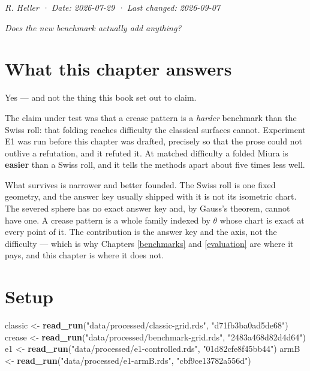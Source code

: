 \documentclass[
  british,
  a4paper,
]{book}
\newenvironment{Shaded}{\begin{snugshade}}{\end{snugshade}}
\newcommand{\FunctionTok}[1]{\textcolor[rgb]{0.13,0.29,0.53}{\textbf{#1}}}
\newcommand{\NormalTok}[1]{#1}
\newcommand{\OtherTok}[1]{\textcolor[rgb]{0.56,0.35,0.01}{#1}}
\newcommand{\StringTok}[1]{\textcolor[rgb]{0.31,0.60,0.02}{#1}}
\begin{document}
\emph{R. Heller · Date: 2026-07-29 · Last changed: 2026-09-07}

\emph{Does the new benchmark actually add anything?}

\section{What this chapter answers}\label{comp-question}

Yes --- and not the thing this book set out to claim.

The claim under test was that a crease pattern is a \emph{harder} benchmark than the
Swiss roll: that folding reaches difficulty the classical surfaces cannot.
Experiment E1 was run before this chapter was drafted, precisely so that the
prose could not outlive a refutation, and it refuted it. At matched difficulty a
folded Miura is \textbf{easier} than a Swiss roll, and it tells the methods apart
about five times less well.

What survives is narrower and better founded. The Swiss roll is one fixed
geometry, and the answer key usually shipped with it is not its isometric chart.
The severed sphere has no exact answer key and, by Gauss's theorem, cannot have
one. A crease pattern is a whole family indexed by \(\theta\) whose chart is exact
at every point of it. The contribution is the answer key and the axis, not the
difficulty --- which is why Chapters \ref{benchmarks} and \ref{evaluation} are
where it pays, and this chapter is where it does not.

\section{Setup}\label{comp-setup}

\begin{Shaded}
\begin{Highlighting}[]
\NormalTok{classic }\OtherTok{\textless{}{-}} \FunctionTok{read\_run}\NormalTok{(}\StringTok{"data/processed/classic{-}grid.rds"}\NormalTok{,   }\StringTok{"d71fb3ba0ad5de68"}\NormalTok{)}
\NormalTok{crease  }\OtherTok{\textless{}{-}} \FunctionTok{read\_run}\NormalTok{(}\StringTok{"data/processed/benchmark{-}grid.rds"}\NormalTok{, }\StringTok{"2483a468d82d4d64"}\NormalTok{)}
\NormalTok{e1      }\OtherTok{\textless{}{-}} \FunctionTok{read\_run}\NormalTok{(}\StringTok{"data/processed/e1{-}controlled.rds"}\NormalTok{,  }\StringTok{"01d82cfe8f45bb44"}\NormalTok{)}
\NormalTok{armB    }\OtherTok{\textless{}{-}} \FunctionTok{read\_run}\NormalTok{(}\StringTok{"data/processed/e1{-}armB.rds"}\NormalTok{,        }\StringTok{"cbf9ce13782a556d"}\NormalTok{)}
\end{Highlighting}
\end{Shaded}
\end{document}
